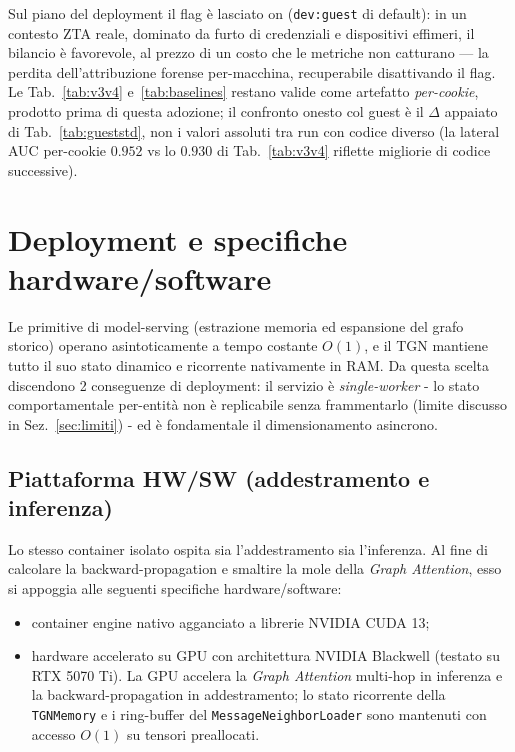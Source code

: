 Sul piano del deployment il flag è lasciato on (\texttt{dev:guest} di default): in un contesto ZTA reale, dominato da furto di credenziali e dispositivi effimeri, il bilancio è favorevole, al prezzo di un costo che le metriche non catturano --- la perdita dell'attribuzione forense per-macchina, recuperabile disattivando il flag. Le Tab.~\ref{tab:v3v4} e~\ref{tab:baselines} restano valide come artefatto \emph{per-cookie}, prodotto prima di questa adozione; il confronto onesto col guest è il $\Delta$ appaiato di Tab.~\ref{tab:gueststd}, non i valori assoluti tra run con codice diverso (la lateral AUC per-cookie $0.952$ vs lo $0.930$ di Tab.~\ref{tab:v3v4} riflette migliorie di codice successive).

\section{Deployment e specifiche hardware/software}
\label{sec:deploy}

Le primitive di model-serving (estrazione memoria ed espansione del grafo storico) operano asintoticamente a tempo costante $O(1)$, e il TGN mantiene tutto il suo stato dinamico e ricorrente nativamente in RAM. Da questa scelta discendono 2 conseguenze di deployment: il servizio è \emph{single-worker} - lo stato comportamentale per-entità non è replicabile senza frammentarlo (limite discusso in Sez.~\ref{sec:limiti}) - ed è fondamentale il dimensionamento asincrono.

\subsection{Piattaforma HW/SW (addestramento e inferenza)}

Lo stesso container isolato ospita sia l'addestramento sia l'inferenza. Al fine di calcolare la backward-propagation e smaltire la mole della \textit{Graph Attention}, esso si appoggia alle seguenti specifiche hardware/software:

\begin{itemize}
    \item container engine nativo agganciato a librerie NVIDIA CUDA 13;
    \item hardware accelerato su GPU con architettura NVIDIA Blackwell (testato su RTX 5070 Ti). La GPU accelera la \textit{Graph Attention} multi-hop in inferenza e la backward-propagation in addestramento; lo stato ricorrente della \texttt{TGNMemory} e i ring-buffer del \texttt{MessageNeighborLoader} sono mantenuti con accesso $O(1)$ su tensori preallocati.
\end{itemize}

